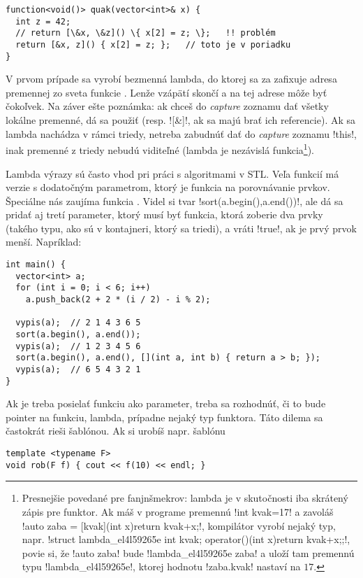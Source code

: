 {\begin{lstlisting}
function<void()> quak(vector<int>& x) {
  int z = 42;
  // return [\&x, \&z]() \{ x[2] = z; \};   !! problém
  return [&x, z]() { x[2] = z; };   // toto je v poriadku
}
\end{lstlisting}

V prvom prípade sa vyrobí bezmenná lambda, do ktorej sa za  zafixuje
adresa premennej  zo sveta funkcie . Lenže  vzápätí skončí
a na tej adrese môže byť čokoľvek. Na záver ešte poznámka: ak chceš do {\em capture}
zoznamu dať všetky lokálne premenné, dá sa použiť \vb{[=]} (resp. \prg![&]!, ak 
sa majú brať ich referencie). Ak sa lambda nachádza v rámci triedy, netreba
zabudnúť dať do {\em capture} zoznamu \prg!this!, inak premenné z triedy nebudú
viditeľné (lambda je nezávislá funkcia\footnote{%
Presnejšie povedané pre fanjnšmekrov: lambda je v skutočnosti iba skrátený zápis pre funktor.
Ak máš v programe premennú \prg!int kvak=17! a zavoláš \prg!auto zaba = [kvak](int x){return kvak+x;}!,
kompilátor vyrobí nejaký typ, napr. 
\prg!struct lambda_el4l59265e {int kvak; operator()(int x){return kvak+x;}};!,
povie si, že \prg!auto zaba! bude \prg!lambda_el4l59265e zaba! a uloží tam premennú typu 
\prg!lambda_el4l59265e!, 
ktorej hodnotu \prg!zaba.kvak! nastaví
na $17$.}).

 Lambda výrazy sú často vhod pri práci s algoritmami v STL. Veľa funkcií
má verzie s dodatočným parametrom, ktorý je funkcia na porovnávanie prvkov.
Špeciálne nás zaujíma funkcia . Videl si tvar 
\prg!sort(a.begin(),a.end())!, ale dá sa pridať aj tretí parameter, ktorý musí byť 
funkcia, ktorá zoberie dva prvky (takého typu, ako sú v kontajneri, ktorý sa triedi),
a vráti \prg!true!, ak je prvý prvok menší. Napríklad:

\begin{lstlisting}
int main() {
  vector<int> a;
  for (int i = 0; i < 6; i++)
    a.push_back(2 + 2 * (i / 2) - i % 2);

  vypis(a);  // 2 1 4 3 6 5
  sort(a.begin(), a.end());
  vypis(a);  // 1 2 3 4 5 6
  sort(a.begin(), a.end(), [](int a, int b) { return a > b; });
  vypis(a);  // 6 5 4 3 2 1
}
\end{lstlisting}

Ak je treba posielať funkciu ako parameter, treba sa rozhodnúť, či to bude pointer na funkciu, lambda, prípadne nejaký typ funktora. Táto dilema sa častokrát rieši šablónou. Ak si urobíš napr. šablónu

\begin{lstlisting}
template <typename F>
void rob(F f) { cout << f(10) << endl; }
\end{lstlisting}

}
